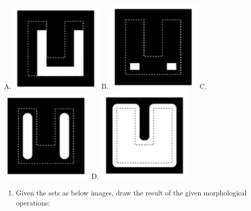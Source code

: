 \documentclass[11pt]{article}
\makeatletter
\def\maxwidth{\ifdim\Gin@nat@width>\linewidth\linewidth
    \else\Gin@nat@width\fi}
\let\Oldincludegraphics\includegraphics
\renewcommand{\includegraphics}[1]{\Oldincludegraphics[width=.8\maxwidth]{#1}}
\providecommand{\tightlist}{%
      \setlength{\itemsep}{0pt}\setlength{\parskip}{0pt}}
\makeatother
\begin{document}
A. \includegraphics{wiki/1_2.jpg} B. \includegraphics{wiki/1_3.jpg} C.
\includegraphics{wiki/1_4.jpg} D. \includegraphics{wiki/1_5.jpg}

\begin{enumerate}
\def\labelenumi{\arabic{enumi}.}
\setcounter{enumi}{1}
\tightlist
\item
  Given the sets as below images, draw the result of the given
  morphological operations:
\end{enumerate}
\end{document}

